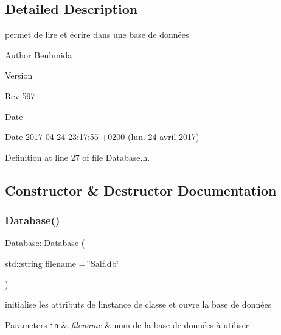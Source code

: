 \subsection{Detailed Description}
permet de lire et écrire dans une base de données 

\begin{DoxyAuthor}{Author}
Benhmida 
\end{DoxyAuthor}
\begin{DoxyVersion}{Version}

\end{DoxyVersion}
\begin{DoxyParagraph}{Rev}
597 
\end{DoxyParagraph}
\begin{DoxyDate}{Date}

\end{DoxyDate}
\begin{DoxyParagraph}{Date}
2017-\/04-\/24 23\+:17\+:55 +0200 (lun. 24 avril 2017) 
\end{DoxyParagraph}


Definition at line 27 of file Database.\+h.



\subsection{Constructor \& Destructor Documentation}
\mbox{\label{class_database_ae6cc395486dbff94bb4e2af329d150ac}} 
\subsubsection{\texorpdfstring{Database()}{Database()}}
{\footnotesize\ttfamily Database\+::\+Database (\begin{DoxyParamCaption}\item[{std\+::string}]{filename = {\ttfamily \char`\"{}Salf.db\char`\"{}} }\end{DoxyParamCaption})\hspace{0.3cm}{\ttfamily [inline]}}



initialise les attributs de l\textquotesingle{}instance de classe et ouvre la base de données 


\begin{DoxyParams}[1]{Parameters}
\mbox{\tt in}  & {\em filename} & nom de la base de données à utiliser \\
\hline
\end{DoxyParams}


